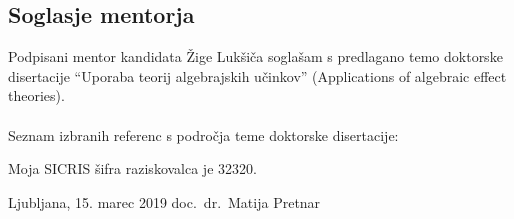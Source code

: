 \documentclass{article}
\begin{document}

\subsection*{Soglasje mentorja}

Podpisani mentor kandidata Žige Lukšiča soglašam s predlagano temo doktorske disertacije ``Uporaba teorij algebrajskih učinkov'' (Applications of algebraic effect theories).
\\
\\
Seznam izbranih referenc s področja teme doktorske disertacije:

\vspace{-10mm}

\renewcommand\refname{}



\vspace{10mm}

\noindent Moja SICRIS šifra raziskovalca je 32320.

\vspace{15mm}

\noindent Ljubljana, 15. marec 2019 \hfill doc.\ dr.\ Matija Pretnar
\end{document}
